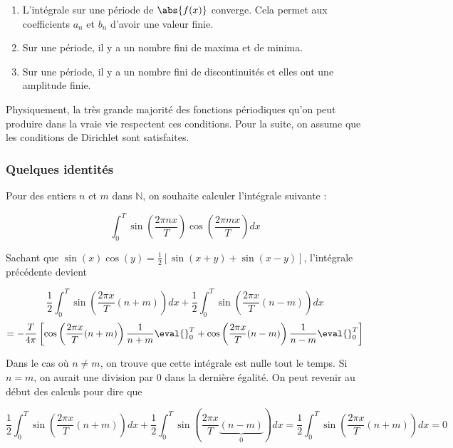 \begin{enumerate}
    \item L'intégrale sur une période de $\abs{f(x)}$ converge. Cela permet aux coefficients $a_n$ et $b_n$ d'avoir une valeur finie.
    \item Sur une période, il y a un nombre fini de maxima et de minima.
    \item Sur une période, il y a un nombre fini de discontinuités et elles ont une amplitude finie.
\end{enumerate}

Physiquement, la très grande majorité des fonctions périodiques qu'on peut produire dans la vraie vie respectent ces conditions. Pour la suite, on assume que les conditions de Dirichlet sont satisfaites.

\subsubsection{Quelques identités}
Pour des entiers $n$ et $m$ dans $\mathbb{N}$, on souhaite calculer l'intégrale suivante :

\begin{equation*}
    \int_{0}^{T}\sin(\frac{2\pi nx}{T})\cos(\frac{2\pi mx}{T})dx
\end{equation*}

Sachant que $\sin(x)\cos(y) = \frac{1}{2}\left[\sin(x+y) + \sin(x-y)\right]$, l'intégrale précédente devient 

\begin{equation*}
    \frac{1}{2}\int_{0}^{T}\sin\left(\frac{2\pi x}{T}(n+m)\right)dx + \frac{1}{2}\int_{0}^{T}\sin\left(\frac{2\pi x}{T}(n-m)\right)dx 
\end{equation*}
\begin{equation*}
    = -\frac{T}{4\pi}\left[\cos\left(\frac{2\pi x}{T}(n+m)\right)\frac{1}{n+m}\eval{}_{0}^{T} + \cos\left(\frac{2\pi x}{T}(n-m)\right)\frac{1}{n-m}\eval{}_{0}^{T}\right]
\end{equation*}

Dans le cas où $n\neq m$, on trouve que cette intégrale est nulle tout le temps. Si $n=m$, on aurait une division par 0 dans la dernière égalité. On peut revenir au début des calculs pour dire que 

\begin{equation*}
    \frac{1}{2}\int_{0}^{T}\sin\left(\frac{2\pi x}{T}(n+m)\right)dx + \frac{1}{2}\int_{0}^{T}\sin\left(\frac{2\pi x}{T}\underbrace{(n-m)}_\text{0}\right)dx = \frac{1}{2}\int_{0}^{T}\sin\left(\frac{2\pi x}{T}(n+m)\right)dx = 0 
\end{equation*}

